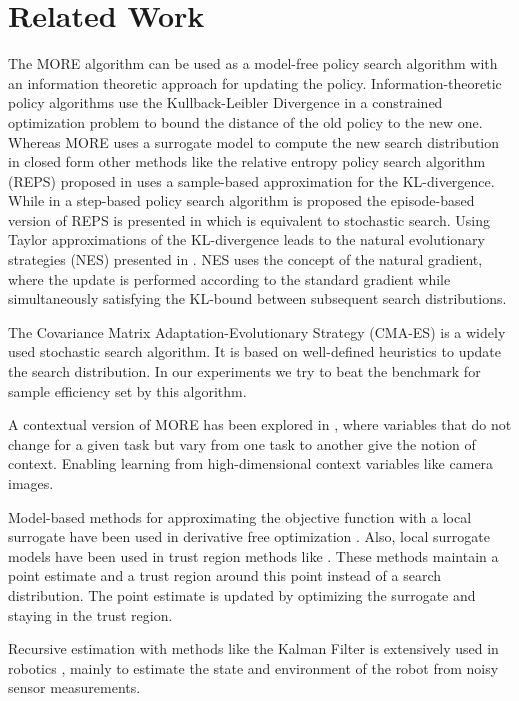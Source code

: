 
\chapter{Related Work}
The MORE algorithm can be used as a model-free policy
search algorithm with an information theoretic approach for
updating the policy.
Information-theoretic policy algorithms use
the Kullback-Leibler Divergence in a constrained optimization problem
to bound the distance of the old policy to the new one.
Whereas MORE uses a surrogate model to compute the new search distribution
in closed form other methods like
the relative entropy policy search algorithm (REPS)
proposed in \citet{peters2010relative} uses a
sample-based approximation for the KL-divergence. While in
\citet{peters2010relative} a step-based policy search
algorithm is proposed the episode-based
version of REPS is presented in \citet{kupcsik2013data} which is equivalent
to stochastic search.
Using Taylor approximations of the KL-divergence leads to the
natural evolutionary strategies (NES)
presented in \citet{wierstra2014natural}. 
NES uses the concept of the natural gradient, where the update is performed
according to the standard gradient while simultaneously satisfying the
KL-bound between subsequent search distributions.

The Covariance Matrix Adaptation-Evolutionary Strategy (CMA-ES)
\citep{hansen2006cma}
is a widely used stochastic search algorithm. It is based on
well-defined heuristics to update the search distribution. In our experiments
we try to beat the benchmark for sample efficiency set by this algorithm.

A contextual version of MORE has been
explored in \citet{tangkaratt2017policy}, where
variables that do not change for a given task
but vary from one task to another
give the notion of context. Enabling
learning from high-dimensional
context variables like camera images.

Model-based methods for approximating the objective function
with a local surrogate have been used in
derivative free optimization \citet{nocedal2006numerical}.
Also, local surrogate models have been used in trust region
methods like \citet{powell2009bobyqa}.
These methods maintain a point estimate
and a trust region around this point instead
of a search distribution. The point estimate is updated by optimizing
the surrogate and staying in the trust region.

Recursive estimation with methods like
the Kalman Filter is extensively used in robotics \citep{chen2011kalman},
mainly to estimate the state and environment of the robot
from noisy sensor measurements.


